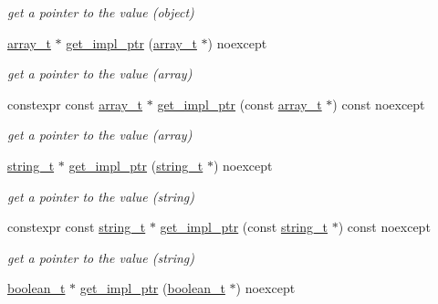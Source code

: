 \begin{DoxyCompactItemize}
\begin{DoxyCompactList}\small\item\em get a pointer to the value (object) \end{DoxyCompactList}\item 
\hyperlink{classnlohmann_1_1basic__json_a53700c308d804f84aea5ff05abb2ac4e}{array\+\_\+t} $\ast$ \hyperlink{classnlohmann_1_1basic__json_a3bbb975975e648f0468a2b96d25debfc}{get\+\_\+impl\+\_\+ptr} (\hyperlink{classnlohmann_1_1basic__json_a53700c308d804f84aea5ff05abb2ac4e}{array\+\_\+t} $\ast$) noexcept
\begin{DoxyCompactList}\small\item\em get a pointer to the value (array) \end{DoxyCompactList}\item 
constexpr const \hyperlink{classnlohmann_1_1basic__json_a53700c308d804f84aea5ff05abb2ac4e}{array\+\_\+t} $\ast$ \hyperlink{classnlohmann_1_1basic__json_ac59c6abb509fe0160e30800cd84b0091}{get\+\_\+impl\+\_\+ptr} (const \hyperlink{classnlohmann_1_1basic__json_a53700c308d804f84aea5ff05abb2ac4e}{array\+\_\+t} $\ast$) const noexcept
\begin{DoxyCompactList}\small\item\em get a pointer to the value (array) \end{DoxyCompactList}\item 
\hyperlink{classnlohmann_1_1basic__json_a33593865ffb1860323dcbd52425b90c8}{string\+\_\+t} $\ast$ \hyperlink{classnlohmann_1_1basic__json_a2c8443b36a3e3c591341a43e8f088c2d}{get\+\_\+impl\+\_\+ptr} (\hyperlink{classnlohmann_1_1basic__json_a33593865ffb1860323dcbd52425b90c8}{string\+\_\+t} $\ast$) noexcept
\begin{DoxyCompactList}\small\item\em get a pointer to the value (string) \end{DoxyCompactList}\item 
constexpr const \hyperlink{classnlohmann_1_1basic__json_a33593865ffb1860323dcbd52425b90c8}{string\+\_\+t} $\ast$ \hyperlink{classnlohmann_1_1basic__json_ad968b5c1134f6aa22bd3c995ab227c11}{get\+\_\+impl\+\_\+ptr} (const \hyperlink{classnlohmann_1_1basic__json_a33593865ffb1860323dcbd52425b90c8}{string\+\_\+t} $\ast$) const noexcept
\begin{DoxyCompactList}\small\item\em get a pointer to the value (string) \end{DoxyCompactList}\item 
\hyperlink{classnlohmann_1_1basic__json_a44fd1a12c9c54623c942b430e7a72937}{boolean\+\_\+t} $\ast$ \hyperlink{classnlohmann_1_1basic__json_a258ec4690664fc0ee2a06a70574995e7}{get\+\_\+impl\+\_\+ptr} (\hyperlink{classnlohmann_1_1basic__json_a44fd1a12c9c54623c942b430e7a72937}{boolean\+\_\+t} $\ast$) noexcept

\end{DoxyCompactItemize}
